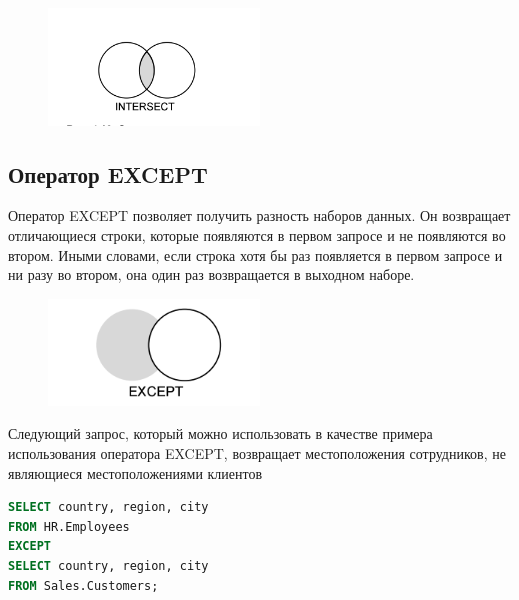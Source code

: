 \begin{figure}[h!]
	\begin{center}
		\includegraphics[width=0.5\textwidth]{img/intersect.png}
	\end{center}
	\captionsetup{justification=centering}
\end{figure}

\subsection{Оператор EXCEPT}
Оператор EXCEPT позволяет получить разность наборов данных. Он возвращает отличающиеся строки, которые появляются в первом запросе и не появляются во втором. Иными словами, если строка хотя бы раз появляется в первом запросе и ни
разу во втором, она один раз возвращается в выходном наборе.

\begin{figure}[h!]
	\begin{center}
		\includegraphics[width=0.5\textwidth]{img/except.png}
	\end{center}
	\captionsetup{justification=centering}
\end{figure}

Следующий запрос, который можно использовать в качестве примера использования оператора EXCEPT, возвращает местоположения сотрудников, не являющиеся
местоположениями клиентов

\begin{lstlisting}[label=lst:funcReturn, language=sql]
SELECT country, region, city
FROM HR.Employees
EXCEPT
SELECT country, region, city
FROM Sales.Customers;
\end{lstlisting}


